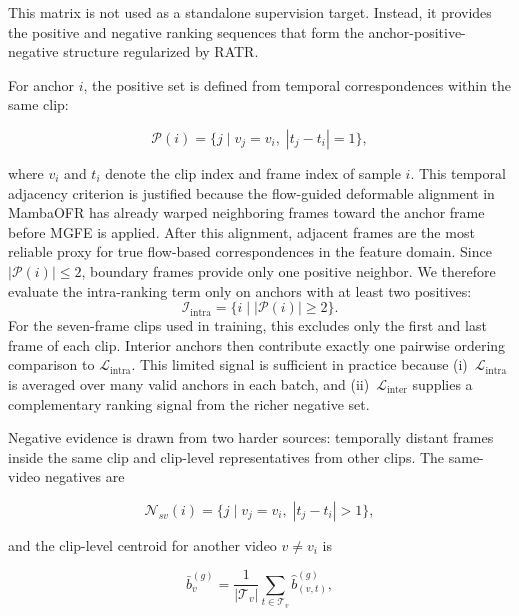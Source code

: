 \documentclass[symmetry,article,submit,pdftex,moreauthors]{Definitions/mdpi}
\begin{document}
This matrix is not used as a standalone supervision target. Instead, it provides the positive and negative ranking sequences that form the anchor-positive-negative structure regularized by RATR.

For anchor $i$, the positive set is defined from temporal correspondences within the same clip:

\begin{equation}
\mathcal{P}(i)=
\bigl\{
j \mid v_j=v_i,\;
|t_j-t_i|=1
\bigr\},
\end{equation}

where $v_i$ and $t_i$ denote the clip index and frame index of sample $i$. This temporal adjacency criterion is justified because the flow-guided deformable alignment in MambaOFR has already warped neighboring frames toward the anchor frame before MGFE is applied. After this alignment, adjacent frames are the most reliable proxy for true flow-based correspondences in the feature domain. Since $|\mathcal{P}(i)| \le 2$, boundary frames provide only one positive neighbor. We therefore evaluate the intra-ranking term only on anchors with at least two positives:
\begin{equation}
\mathcal{I}_{\text{intra}}=
\bigl\{
i \mid |\mathcal{P}(i)| \ge 2
\bigr\}.
\end{equation}
For the seven-frame clips used in training, this excludes only the first and last frame of each clip. Interior anchors then contribute exactly one pairwise ordering comparison to $\mathcal{L}_{\text{intra}}$. This limited signal is sufficient in practice because (i)~$\mathcal{L}_{\text{intra}}$ is averaged over many valid anchors in each batch, and (ii)~$\mathcal{L}_{\text{inter}}$ supplies a complementary ranking signal from the richer negative set.

Negative evidence is drawn from two harder sources: temporally distant frames inside the same clip and clip-level representatives from other clips. The same-video negatives are

\begin{equation}
\mathcal{N}_{sv}(i)=
\bigl\{
j \mid v_j=v_i,\;
|t_j-t_i|>1
\bigr\},
\end{equation}

and the clip-level centroid for another video $v\neq v_i$ is

\begin{equation}
\bar{b}_{v}^{(g)} =
\frac{1}{|\mathcal{T}_v|}
\sum_{t\in\mathcal{T}_v}
\widehat{b}_{(v,t)}^{(g)},
\end{equation}
\end{document}
